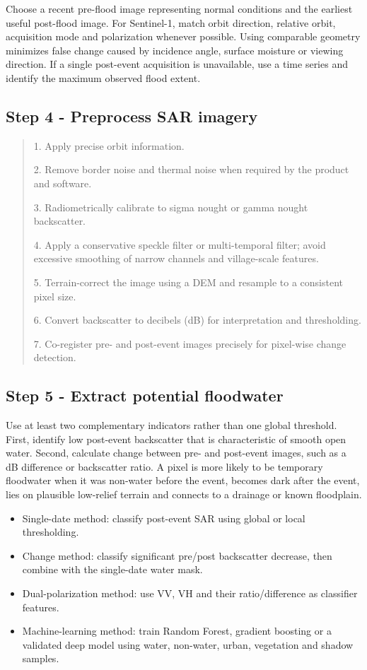 \documentclass[11pt,a4paper]{article}
\begin{document}
Choose a recent pre-flood image representing normal conditions and the earliest useful post-flood image. For Sentinel-1, match orbit direction, relative orbit, acquisition mode and polarization whenever possible. Using comparable geometry minimizes false change caused by incidence angle, surface moisture or viewing direction. If a single post-event acquisition is unavailable, use a time series and identify the maximum observed flood extent.

\subsection{Step 4 - Preprocess SAR imagery}\label{step-4---preprocess-sar-imagery}

\begin{quote}
1. Apply precise orbit information.

2. Remove border noise and thermal noise when required by the product and software.

3. Radiometrically calibrate to sigma nought or gamma nought backscatter.

4. Apply a conservative speckle filter or multi-temporal filter; avoid excessive smoothing of narrow channels and village-scale features.

5. Terrain-correct the image using a DEM and resample to a consistent pixel size.

6. Convert backscatter to decibels (dB) for interpretation and thresholding.

7. Co-register pre- and post-event images precisely for pixel-wise change detection.
\end{quote}

\subsection{Step 5 - Extract potential floodwater}\label{step-5---extract-potential-floodwater}

Use at least two complementary indicators rather than one global threshold. First, identify low post-event backscatter that is characteristic of smooth open water. Second, calculate change between pre- and post-event images, such as a dB difference or backscatter ratio. A pixel is more likely to be temporary floodwater when it was non-water before the event, becomes dark after the event, lies on plausible low-relief terrain and connects to a drainage or known floodplain.

\begin{itemize}
\item
  Single-date method: classify post-event SAR using global or local thresholding.
\item
  Change method: classify significant pre/post backscatter decrease, then combine with the single-date water mask.
\item
  Dual-polarization method: use VV, VH and their ratio/difference as classifier features.
\item
  Machine-learning method: train Random Forest, gradient boosting or a validated deep model using water, non-water, urban, vegetation and shadow samples.
\end{itemize}
\end{document}
